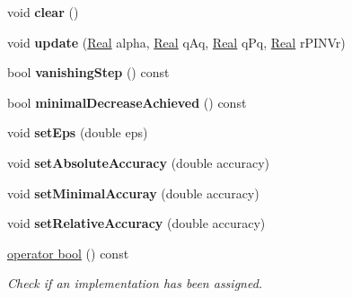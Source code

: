 \begin{DoxyCompactItemize}
\item 
\hypertarget{classSpacy_1_1CG_1_1TerminationCriterion_a347651c14a38ce3bf1c92454aded97ab}{}void {\bfseries clear} ()\label{classSpacy_1_1CG_1_1TerminationCriterion_a347651c14a38ce3bf1c92454aded97ab}

\item 
\hypertarget{classSpacy_1_1CG_1_1TerminationCriterion_a1d62480faacee959cdf628a0e951caa5}{}void {\bfseries update} (\hyperlink{classSpacy_1_1Real}{Real} alpha, \hyperlink{classSpacy_1_1Real}{Real} q\+Aq, \hyperlink{classSpacy_1_1Real}{Real} q\+Pq, \hyperlink{classSpacy_1_1Real}{Real} r\+P\+I\+N\+Vr)\label{classSpacy_1_1CG_1_1TerminationCriterion_a1d62480faacee959cdf628a0e951caa5}

\item 
\hypertarget{classSpacy_1_1CG_1_1TerminationCriterion_ab92b8e27edb8290ed34c34a242f900d3}{}bool {\bfseries vanishing\+Step} () const \label{classSpacy_1_1CG_1_1TerminationCriterion_ab92b8e27edb8290ed34c34a242f900d3}

\item 
\hypertarget{classSpacy_1_1CG_1_1TerminationCriterion_a928da2a9183b773ca90477057b3d2b8b}{}bool {\bfseries minimal\+Decrease\+Achieved} () const \label{classSpacy_1_1CG_1_1TerminationCriterion_a928da2a9183b773ca90477057b3d2b8b}

\item 
\hypertarget{classSpacy_1_1CG_1_1TerminationCriterion_a59099ba9af213a66a33bb5b7c7061e11}{}void {\bfseries set\+Eps} (double eps)\label{classSpacy_1_1CG_1_1TerminationCriterion_a59099ba9af213a66a33bb5b7c7061e11}

\item 
\hypertarget{classSpacy_1_1CG_1_1TerminationCriterion_a833711290bf75d7cf7450f163f537510}{}void {\bfseries set\+Absolute\+Accuracy} (double accuracy)\label{classSpacy_1_1CG_1_1TerminationCriterion_a833711290bf75d7cf7450f163f537510}

\item 
\hypertarget{classSpacy_1_1CG_1_1TerminationCriterion_a1aa3236005b1fac2dcc0517140d05714}{}void {\bfseries set\+Minimal\+Accuray} (double accuracy)\label{classSpacy_1_1CG_1_1TerminationCriterion_a1aa3236005b1fac2dcc0517140d05714}

\item 
\hypertarget{classSpacy_1_1CG_1_1TerminationCriterion_acea2a40d3f62813a3daa69ebbe8f2d16}{}void {\bfseries set\+Relative\+Accuracy} (double accuracy)\label{classSpacy_1_1CG_1_1TerminationCriterion_acea2a40d3f62813a3daa69ebbe8f2d16}

\item 
\hypertarget{classSpacy_1_1CG_1_1TerminationCriterion_abe19e6c2eeae32de44508ff4131462aa}{}\hyperlink{classSpacy_1_1CG_1_1TerminationCriterion_abe19e6c2eeae32de44508ff4131462aa}{operator bool} () const \label{classSpacy_1_1CG_1_1TerminationCriterion_abe19e6c2eeae32de44508ff4131462aa}

\begin{DoxyCompactList}\small\item\em Check if an implementation has been assigned. \end{DoxyCompactList}\end{DoxyCompactItemize}


